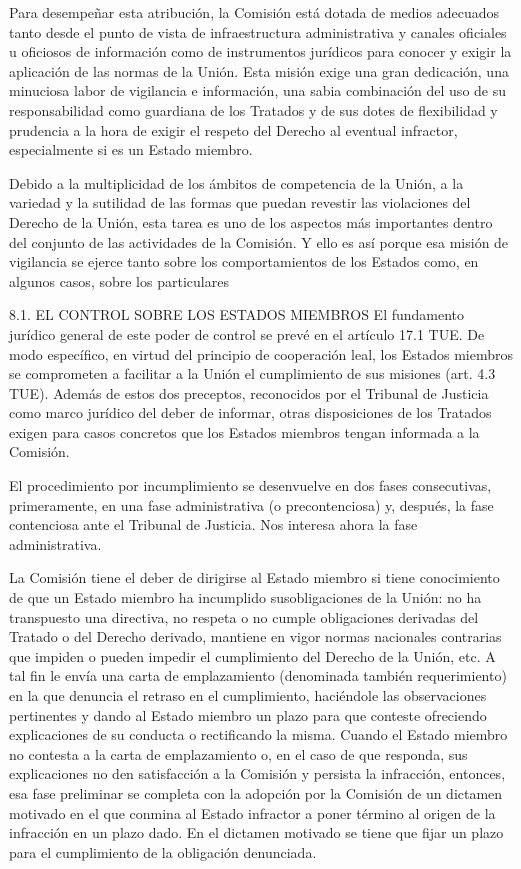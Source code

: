 \documentclass[10pt,a4paper]{article}
\begin{document}
Para desempeñar esta atribución, la Comisión está dotada de medios adecuados tanto desde el punto de vista de infraestructura administrativa y canales oficiales u oficiosos de información como de instrumentos jurídicos para conocer y exigir la aplicación de las normas de la Unión. Esta misión exige una gran dedicación, una minuciosa labor de vigilancia e información, una sabia combinación del uso de su responsabilidad como guardiana de los Tratados y de sus dotes de flexibilidad y prudencia a la hora de exigir el respeto del Derecho al eventual infractor, especialmente si es un Estado miembro.

Debido a la multiplicidad de los ámbitos de competencia de la Unión, a la variedad y la sutilidad de las formas que puedan revestir las violaciones del Derecho de la Unión, esta tarea es uno de los aspectos más importantes dentro del conjunto de las actividades de la Comisión. Y ello es así porque esa misión de vigilancia se ejerce tanto sobre los comportamientos de los Estados como, en algunos casos, sobre los particulares

8.1. EL CONTROL SOBRE LOS ESTADOS MIEMBROS
El fundamento jurídico general de este poder de control se prevé en el artículo 17.1 TUE. De modo específico, en virtud del principio de cooperación leal, los Estados miembros se comprometen a facilitar a la Unión el cumplimiento de sus misiones (art. 4.3 TUE). Además de estos dos preceptos, reconocidos por el Tribunal de Justicia como marco jurídico del deber de informar, otras disposiciones de los Tratados exigen para casos concretos que los Estados miembros tengan informada a la Comisión.

El procedimiento por incumplimiento se desenvuelve en dos fases consecutivas, primeramente, en una fase administrativa (o precontenciosa) y, después, la fase contenciosa ante el Tribunal de Justicia. Nos interesa ahora la fase administrativa.

La Comisión tiene el deber de dirigirse al Estado miembro si tiene conocimiento de que un Estado miembro ha incumplido susobligaciones de la Unión: no ha transpuesto una directiva, no respeta o no cumple obligaciones derivadas del Tratado o del Derecho derivado, mantiene en vigor normas nacionales contrarias que impiden o pueden impedir el cumplimiento del Derecho de la Unión, etc. A tal fin le envía una carta de emplazamiento (denominada también requerimiento) en la que denuncia el retraso en el cumplimiento, haciéndole las observaciones pertinentes y dando al Estado miembro un plazo para que conteste ofreciendo explicaciones de su conducta o rectificando la misma. Cuando el Estado miembro no contesta a la carta de emplazamiento o, en el caso de que responda, sus explicaciones no den satisfacción a la Comisión y persista la infracción, entonces, esa fase preliminar se completa con la adopción por la Comisión de un dictamen motivado en el que conmina al Estado infractor a poner término al origen de la infracción en un plazo dado. En el dictamen motivado se tiene que fijar un plazo para el cumplimiento de la obligación denunciada. 
\end{document}
